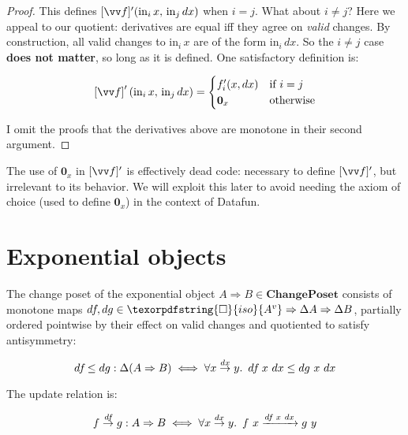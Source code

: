 \documentclass[]{rntz}
\newcommand\cat\textbf
\newcommand\strong\textbf
\newcommand\CP{\cat{ChangePoset}}
\newcommand\D\Delta
\newcommand\injc{\mathrm{in}}
\newcommand\inj[1]{\injc_{#1}\,}
\newcommand\zero{\ensuremath{\mathbold{0}}}
\newcommand\iso{\texorpdfstring{\ensuremath{\square}}{iso}}
\newcommand\isof[1]{\iso {#1}}
\newcommand\vals[1]{#1^v} %
\newcommand\chgs[1]{\D{#1}}
\newcommand\krof[1]{[{#1}]}
\newcommand\Krof[1]{\left[{#1}\right]}
\newcommand\deriv[1]{#1'}
\newcommand\bindsp{~\,}
\newcommand\fa[1]{\forall #1.\bindsp}
\newcommand\validarrow\to
\newcommand\vld[3]{{#2 \mathrel{\overset{#1}{\validarrow}} #3}}
\newcommand\longvld[3]{{#2 \xrightarrow{#1} #3}}
\begin{document}
\begin{proof}
  This defines $\deriv{\krof{\vv f}}(\inj i x,\, \inj j dx)$ when $i = j$. What
  about $i \ne j$? Here we appeal to our quotient: derivatives are equal iff
  they agree on \emph{valid} changes. By construction, all valid changes to
  $\inj i x$ are of the form $\inj i dx$. So the $i \ne j$ case \strong{does not
    matter}, so long as it is defined. One satisfactory definition is:

  \begin{equation*}
    \deriv{\Krof{\vv f}}(\inj i x,\, \inj j dx) = 
    \begin{cases}
      \deriv f_i(x,dx) & \text{if}~ i=j\\
      \zero_x & \text{otherwise}
    \end{cases}
  \end{equation*}

  I omit the proofs that the derivatives above are monotone in their second
  argument.
\end{proof}

\noindent
The use of $\zero_x$ in $\deriv{\krof{\vv f}}$ is effectively dead code:
necessary to define $\deriv{\krof{\vv f}}$, but irrelevant to its behavior. We
will exploit this later to avoid needing the axiom of choice (used to define
$\zero_x$) in the context of Datafun.


\section{Exponential objects}

\newcommand\expO[2]{#1 \Rightarrow #2}
\newcommand\df{d\kern-.1em f\kern-.1em} %

The change poset of the exponential object $\expO A B \in \CP$ consists of
monotone maps $\df, dg \in \expO{\isof{\vals A}}{\expO{\chgs A}{\chgs B}}$,
partially ordered pointwise by their effect on valid changes and quotiented to
satisfy antisymmetry:

\begin{equation*}
  \df \le dg : \chgs{(\expO A B)}
  \iff \fa{\vld{dx} x y} \df ~x ~dx \le dg ~x ~dx 
\end{equation*}

\noindent
The update relation is:

\begin{equation}\label{eqn:function-update}
  \vld{\df} f g : \expO A B
  \iff \fa{\vld{dx} x y} \longvld{\df~x~dx}{f~x}{g~y}
\end{equation}
\end{document}
